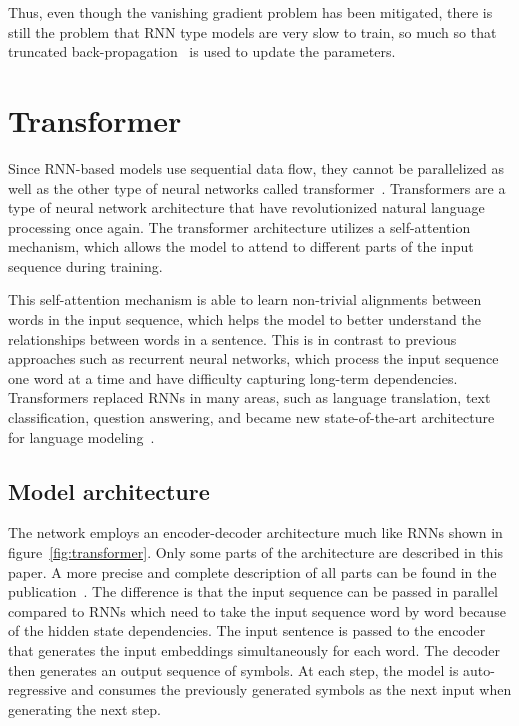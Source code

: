 Thus, even though the vanishing gradient problem has been mitigated, there is still the problem that RNN type models are very slow to train, so much so that truncated back-propagation~\cite{back-propagation} is used to update the parameters. 

\section{Transformer} \label{transformer}
Since RNN-based models use sequential data flow, they cannot be parallelized as well as the other type of neural networks called transformer~\cite{transformer}. Transformers are a type of neural network architecture that have revolutionized natural language processing once again. The transformer architecture utilizes a self-attention mechanism, which allows the model to attend to different parts of the input sequence during training.

This self-attention mechanism is able to learn non-trivial alignments between words in the input sequence, which helps the model to better understand the relationships between words in a sentence. This is in contrast to previous approaches such as recurrent neural networks, which process the input sequence one word at a time and have difficulty capturing long-term dependencies. Transformers replaced RNNs in many areas, such as language translation, text classification, question answering, and became new state-of-the-art architecture for language modeling~\cite{transformers_vs_rnn}. 

\subsection{Model architecture}
The network employs an encoder-decoder architecture much like RNNs shown in figure~\ref{fig:transformer}. Only some parts of the architecture are described in this paper. A more precise and complete description of all parts can be found in the publication~\cite{transformer}. The difference is that the input sequence can be passed in parallel compared to RNNs which need to take the input sequence word by word because of the hidden state dependencies. The input sentence is passed to the encoder that generates the input embeddings simultaneously for each word. The decoder then generates an output sequence of symbols. At each step, the model is auto-regressive and consumes the previously generated symbols as the next input when generating the next step.

